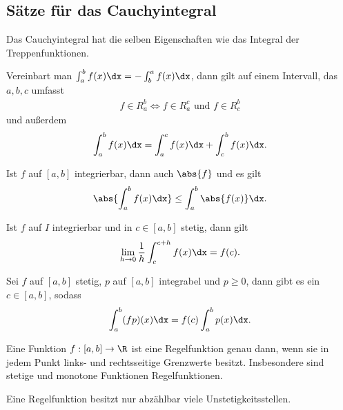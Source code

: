\subsection{Sätze für das Cauchyintegral}
\begin{prop}
Das Cauchyintegral hat die selben Eigenschaften wie das Integral der
Treppenfunktionen.
\end{prop}
\begin{prop}[Intervalladditivität]
Vereinbart man $\int_a^b f(x)\dx = -\int_b^a f(x)\dx$, dann gilt auf einem
Intervall, das $a,b,c$ umfasst
\begin{align*}
f\in R_a^b \Leftrightarrow f\in R_a^c \text{ und } f\in
R_c^b
\end{align*}
und außerdem
\begin{align*}
\int_a^b f(x)\dx = \int_a^c f(x)\dx + \int_c^b f(x)\dx.
\end{align*}
\end{prop}
\begin{prop}
Ist $f$ auf $[a,b]$ integrierbar, dann auch $\abs{f}$ und es gilt
\begin{align*}
\abs{\int_a^b f(x)\dx} \le \int_a^b \abs{f(x)}\dx.
\end{align*}
\end{prop}
\begin{prop}
Ist $f$ auf $I$ integrierbar und in $c\in[a,b]$ stetig, dann gilt
\begin{align*}
\lim\limits_{h\to0} \frac{1}{h} \int_{c}^{c+h} f(x) \dx = f(c).
\end{align*}
\end{prop}
\begin{prop}
Sei $f$ auf $[a,b]$ stetig, $p$ auf $[a,b]$ integrabel und $p\ge0$, dann gibt es
ein $c\in[a,b]$, sodass
\begin{align*}
\int_{a}^b (fp)(x) \dx = f(c)\int_a^b p(x)\dx.
\end{align*}
\end{prop}
\begin{prop}
Eine Funktion $f: [a,b]\to\R$ ist eine Regelfunktion genau dann, wenn
sie in jedem Punkt links- und rechtsseitige Grenzwerte besitzt.
Insbesondere sind stetige und monotone Funktionen Regelfunktionen.
\end{prop}
\begin{prop}
Eine Regelfunktion besitzt nur abzählbar viele Unstetigkeitsstellen.
\end{prop}
